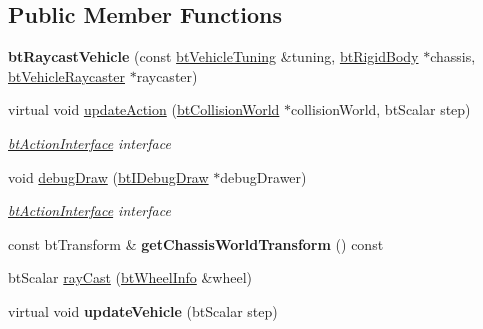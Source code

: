 \subsection*{Public Member Functions}
\begin{DoxyCompactItemize}
\item 
\hypertarget{classbt_raycast_vehicle_a7dd285cde99f2fb2b6c6a38ff4e4e151}{{\bfseries bt\+Raycast\+Vehicle} (const \hyperlink{classbt_raycast_vehicle_1_1bt_vehicle_tuning}{bt\+Vehicle\+Tuning} \&tuning, \hyperlink{classbt_rigid_body}{bt\+Rigid\+Body} $\ast$chassis, \hyperlink{structbt_vehicle_raycaster}{bt\+Vehicle\+Raycaster} $\ast$raycaster)}\label{classbt_raycast_vehicle_a7dd285cde99f2fb2b6c6a38ff4e4e151}

\item 
\hypertarget{classbt_raycast_vehicle_a22d127e6b87137131485cdebd65ea5af}{virtual void \hyperlink{classbt_raycast_vehicle_a22d127e6b87137131485cdebd65ea5af}{update\+Action} (\hyperlink{classbt_collision_world}{bt\+Collision\+World} $\ast$collision\+World, bt\+Scalar step)}\label{classbt_raycast_vehicle_a22d127e6b87137131485cdebd65ea5af}

\begin{DoxyCompactList}\small\item\em \hyperlink{classbt_action_interface}{bt\+Action\+Interface} interface \end{DoxyCompactList}\item 
\hypertarget{classbt_raycast_vehicle_ab5dfeb4a57f735f6fb069bfc5654428d}{void \hyperlink{classbt_raycast_vehicle_ab5dfeb4a57f735f6fb069bfc5654428d}{debug\+Draw} (\hyperlink{classbt_i_debug_draw}{bt\+I\+Debug\+Draw} $\ast$debug\+Drawer)}\label{classbt_raycast_vehicle_ab5dfeb4a57f735f6fb069bfc5654428d}

\begin{DoxyCompactList}\small\item\em \hyperlink{classbt_action_interface}{bt\+Action\+Interface} interface \end{DoxyCompactList}\item 
\hypertarget{classbt_raycast_vehicle_a93d9b1de8b55f484f501f63125df9cab}{const bt\+Transform \& {\bfseries get\+Chassis\+World\+Transform} () const }\label{classbt_raycast_vehicle_a93d9b1de8b55f484f501f63125df9cab}

\item 
bt\+Scalar \hyperlink{classbt_raycast_vehicle_a53451c4e3495561f3f078b2041ef04be}{ray\+Cast} (\hyperlink{structbt_wheel_info}{bt\+Wheel\+Info} \&wheel)
\item 
\hypertarget{classbt_raycast_vehicle_a9c7597378358b8f4609aa87090116014}{virtual void {\bfseries update\+Vehicle} (bt\+Scalar step)}\label{classbt_raycast_vehicle_a9c7597378358b8f4609aa87090116014}


\end{DoxyCompactItemize}
